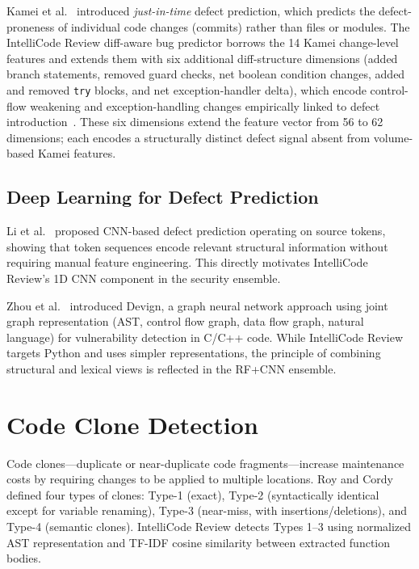 \documentclass[12pt, oneside]{report}
\begin{document}
Kamei et al.~\cite{kamei2013} introduced \textit{just-in-time} defect prediction, which
predicts the defect-proneness of individual code changes (commits) rather than files or
modules. The IntelliCode Review diff-aware bug predictor borrows the 14 Kamei change-level
features and extends them with six additional diff-structure dimensions (added branch
statements, removed guard checks, net boolean condition changes, added and removed
\texttt{try} blocks, and net exception-handler delta), which encode control-flow weakening
and exception-handling changes empirically linked to defect introduction~\cite{mockus2000,eyolfson2011}.
These six dimensions extend the feature vector from 56 to 62 dimensions; each encodes
a structurally distinct defect signal absent from volume-based Kamei features.

\subsection{Deep Learning for Defect Prediction}

Li et al.~\cite{li2017} proposed CNN-based defect prediction operating on source tokens,
showing that token sequences encode relevant structural information without requiring
manual feature engineering. This directly motivates IntelliCode Review's 1D CNN component
in the security ensemble.

Zhou et al.~\cite{zhou2019} introduced Devign, a graph neural network approach using
joint graph representation (AST, control flow graph, data flow graph, natural language)
for vulnerability detection in C/C++ code. While IntelliCode Review targets Python and
uses simpler representations, the principle of combining structural and lexical views
is reflected in the RF+CNN ensemble.

\section{Code Clone Detection}
\label{sec:rel-clone}

Code clones---duplicate or near-duplicate code fragments---increase maintenance costs by
requiring changes to be applied to multiple locations. Roy and Cordy~\cite{roy2007}
defined four types of clones: Type-1 (exact), Type-2 (syntactically identical except for
variable renaming), Type-3 (near-miss, with insertions/deletions), and Type-4 (semantic
clones). IntelliCode Review detects Types 1--3 using normalized AST representation and
TF-IDF cosine similarity between extracted function bodies.
\end{document}
